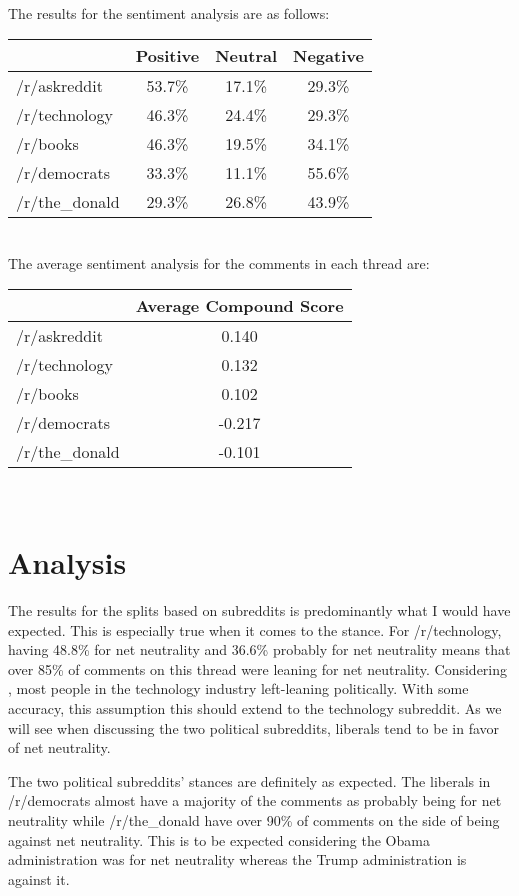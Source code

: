 \documentclass[11pt]{article}
\begin{document}
	\\[2\baselineskip]
	The results for the sentiment analysis are as follows:
	\\[2\baselineskip]
	\begin{tabular}{l|ccc}
		& Positive & Neutral & Negative \\\hline
		/r/askreddit & 53.7\% & 17.1\% & 29.3\% \\
		/r/technology & 46.3\% & 24.4\% & 29.3\% \\
		/r/books & 46.3\% & 19.5\% & 34.1\% \\
		/r/democrats & 33.3\% & 11.1\% & 55.6\% \\
		/r/the\_donald & 29.3\% & 26.8\% & 43.9\%
	\end{tabular}
	\\[2\baselineskip]
	The average sentiment analysis for the comments in each thread are:
	\\[2\baselineskip]
	\begin{tabular}{l|c}
		& Average Compound Score \\\hline
		/r/askreddit & 0.140 \\
		/r/technology & 0.132 \\
		/r/books & 0.102 \\
		/r/democrats & -0.217 \\
		/r/the\_donald & -0.101
	\end{tabular}
	\\[2\baselineskip]
	\section{Analysis}\label{sec:analysis}
	The results for the splits based on subreddits is predominantly what I would have expected. This is especially true when it comes to the stance. For /r/technology, having 48.8\% for net neutrality and 36.6\% probably for net neutrality means that over 85\% of comments on this thread were leaning for net neutrality. Considering \cite{pearlstein_2018}, most people in the technology industry left-leaning politically. With some accuracy, this assumption this should extend to the technology subreddit. As we will see when discussing the two political subreddits, liberals tend to be in favor of net neutrality. 
	
	The two political subreddits' stances are definitely as expected. The liberals in /r/democrats almost have a majority of the comments as probably being for net neutrality while /r/the\_donald have over 90\% of comments on the side of being against net neutrality. This is to be expected considering the Obama administration was for net neutrality whereas the Trump administration is against it. 
	
\end{document}

